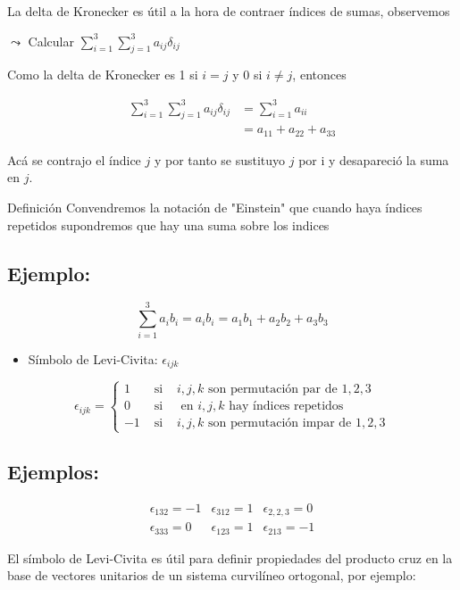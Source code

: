 La delta de Kronecker es útil a la hora de contraer índices de sumas, observemos

$\leadsto$ Calcular $\sum_{i=1}^{3} \sum_{j=1}^{3} a_{i j} \delta_{i j}$

Como la delta de Kronecker es 1 si $i=j$ y 0 si $i \neq j$, entonces

$$
\begin{aligned}
\sum_{i=1}^{3} \sum_{j=1}^{3} a_{i j} \delta_{i j} & =\sum_{i=1}^{3} a_{i i} \\
& =a_{11}+a_{22}+a_{33}
\end{aligned}
$$

Acá se contrajo el índice $j$ y por tanto se sustituyo $j$ por i y desapareció la suma en $j$.

Definición Convendremos la notación de "Einstein" que cuando haya índices repetidos supondremos que hay una suma sobre los indices

\subsection{Ejemplo:}
$$
\sum_{i=1}^{3} a_{i} b_{i}=a_{i} b_{i}=a_{1} b_{1}+a_{2} b_{2}+a_{3} b_{3}
$$

\begin{itemize}
  \item Símbolo de Levi-Civita: $\epsilon_{i j k}$
\end{itemize}

$$
\epsilon_{i j k}=\left\{\begin{array}{lll}
1 & \text { si } & i, j, k \text { son permutación par de } 1,2,3 \\
0 & \text { si } & \text { en } i, j, k \text { hay índices repetidos } \\
-1 & \text { si } & i, j, k \text { son permutación impar de } 1,2,3
\end{array}\right.
$$

\subsection{Ejemplos:}
$$
\begin{array}{llrl}
\epsilon_{132}=-1 & \epsilon_{312}=1 & \epsilon_{2,2,3}=0 \\
\epsilon_{333}=0 & \epsilon_{123}=1 & \epsilon_{213}=-1
\end{array}
$$

El símbolo de Levi-Civita es útil para definir propiedades del producto cruz en la base de vectores unitarios de un sistema curvilíneo ortogonal, por ejemplo:

